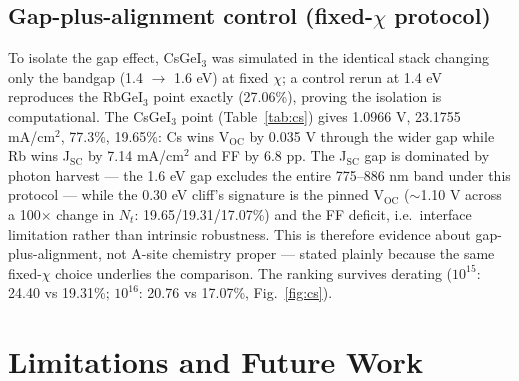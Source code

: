 \documentclass[aip,amsmath,amssymb,preprint]{revtex4-2}
\begin{document}
\subsection{Gap-plus-alignment control (fixed-$\chi$ protocol)}
To isolate the gap effect, CsGeI$_{3}$ was simulated in the identical stack changing only the bandgap (1.4 $\rightarrow$ 1.6 eV) at fixed $\chi$; a control rerun at 1.4 eV reproduces the RbGeI$_{3}$ point exactly (27.06\%), proving the isolation is computational. The CsGeI$_{3}$ point (Table~\ref{tab:cs}) gives 1.0966 V, 23.1755 mA/cm$^{2}$, 77.3\%, 19.65\%: Cs wins V$_{\mathrm{OC}}$ by 0.035 V through the wider gap while Rb wins J$_{\mathrm{SC}}$ by 7.14 mA/cm$^{2}$ and FF by 6.8 pp. The J$_{\mathrm{SC}}$ gap is dominated by photon harvest --- the 1.6 eV gap excludes the entire 775--886 nm band under this protocol --- while the 0.30 eV cliff's signature is the pinned V$_{\mathrm{OC}}$ ($\sim$1.10 V across a 100$\times$ change in $N_{t}$: 19.65/19.31/17.07\%) and the FF deficit, i.e.\ interface limitation rather than intrinsic robustness. This is therefore evidence about gap-plus-alignment, not A-site chemistry proper --- stated plainly because the same fixed-$\chi$ choice underlies the comparison. The ranking survives derating ($10^{15}$: 24.40 vs 19.31\%; $10^{16}$: 20.76 vs 17.07\%, Fig.~\ref{fig:cs}).


\section{Limitations and Future Work}
\end{document}
